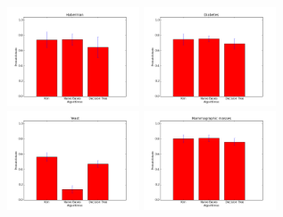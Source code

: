 \documentclass[12pt, a4paper]{article}
\begin{document}
\begin{landscape}
\begin{figure}[!htb]
    \includegraphics[width=0.35\textwidth]{Habermans_Survival/acuracias.png}    
    \includegraphics[width=0.35\textwidth]{Pima_Indians_Diabetes/acuracias.png}
    \includegraphics[width=0.35\textwidth]{Yeast/acuracias.png}
    \includegraphics[width=0.35\textwidth]{Mammographic_Mass/acuracias.png}          
\end{figure}
\end{landscape}
\end{document}
